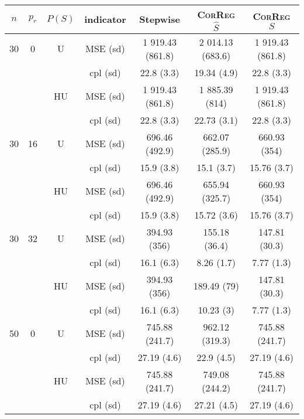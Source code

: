 \documentclass[11pt,a4paper]{article}
\begin{document}
\begin{table}[h!]
\centering
\begin{tabular}{|c|c|c|c|c|c|c|}
\hline 
$n$ & $p_r$&  $P(S)$ &indicator &Stepwise  &    \textsc{CorReg} $\hat S$& \textsc{CorReg} $S$\\ 
\hline %
30 & 0 & U& MSE (sd) & 1 919.43 (861.8) & 2 014.13 (683.6) & 1 919.43 (861.8) \\
& & &cpl (sd) & 22.8 (3.3) & 19.34 (4.9) & 22.8 (3.3) \\
 &  &HU &MSE (sd) & 1 919.43 (861.8) & 1 885.39 (814) & 1 919.43 (861.8) \\
& & & cpl (sd) & 22.8 (3.3) & 22.73 (3.1) & 22.8 (3.3) \\
\hline %
30 & 16 & U&MSE (sd) & 696.46 (492.9) & 662.07 (285.9) & 660.93 (354) \\
& & & cpl (sd) & 15.9 (3.8) & 15.1 (3.7) & 15.76 (3.7) \\
 &  &HU &MSE (sd) & 696.46 (492.9) & 655.94 (325.7) & 660.93 (354) \\
& & & cpl (sd) & 15.9 (3.8) & 15.72 (3.6) & 15.76 (3.7) \\
\hline %
30 & 32 & U & MSE (sd) & 394.93 (356) & 155.18 (36.4) & 147.81 (30.3) \\
& & &cpl (sd) & 16.1 (6.3) & 8.26 (1.7) & 7.77 (1.3) \\
 &  & HU &  MSE (sd) & 394.93 (356) & 189.49 (79) & 147.81 (30.3) \\
& & & cpl (sd) & 16.1 (6.3) & 10.23 (3) & 7.77 (1.3) \\
\hline
\hline %
50 & 0 & U&MSE (sd) & 745.88 (241.7) & 962.12 (319.3) & 745.88 (241.7) \\
& & & cpl (sd) & 27.19 (4.6) & 22.9 (4.5) & 27.19 (4.6) \\
 &  & HU &MSE (sd) & 745.88 (241.7) & 749.08 (244.2) & 745.88 (241.7) \\
& & & cpl (sd) & 27.19 (4.6) & 27.21 (4.5) & 27.19 (4.6) \\

\end{tabular}
\end{table}
\end{document}
